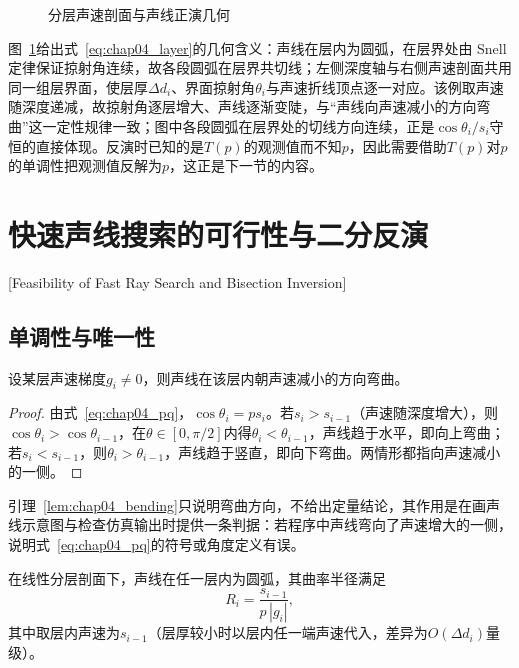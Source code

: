 \begin{figure}[htbp]
 \centering
 \begin{tikzpicture}[x=1cm,y=1cm]
  
 \end{tikzpicture}
 \caption[分层声速剖面与声线正演几何]{分层声速剖面与声线正演几何}
 \label{fig:chap04_ray_geom}
\end{figure}

图~\ref{fig:chap04_ray_geom}给出式~\eqref{eq:chap04_layer}的几何含义：声线在层内为圆弧，在层界处由 Snell 定律保证掠射角连续，故各段圆弧在层界共切线；左侧深度轴与右侧声速剖面共用同一组层界面，使层厚$\Delta d_i$、界面掠射角$\theta_i$与声速折线顶点逐一对应。该例取声速随深度递减，故掠射角逐层增大、声线逐渐变陡，与“声线向声速减小的方向弯曲”这一定性规律一致；图中各段圆弧在层界处的切线方向连续，正是$\cos\theta_i/s_i$守恒的直接体现。反演时已知的是$T(p)$的观测值而不知$p$，因此需要借助$T(p)$对$p$的单调性把观测值反解为$p$，这正是下一节的内容。

\section{快速声线搜索的可行性与二分反演}[Feasibility of Fast Ray Search and Bisection Inversion]
\label{sec:chap04_fast}

\subsection{单调性与唯一性}

\begin{lemma}[（弯曲方向）]
\label{lem:chap04_bending}
设某层声速梯度$g_i\ne0$，则声线在该层内朝声速减小的方向弯曲。
\end{lemma}

\begin{proof}
由式~\eqref{eq:chap04_pq}，$\cos\theta_i=p s_i$。若$s_i>s_{i-1}$（声速随深度增大），则$\cos\theta_i>\cos\theta_{i-1}$，在$\theta\in[0,\pi/2]$内得$\theta_i<\theta_{i-1}$，声线趋于水平，即向上弯曲；若$s_i<s_{i-1}$，则$\theta_i>\theta_{i-1}$，声线趋于竖直，即向下弯曲。两情形都指向声速减小的一侧。
\end{proof}

引理~\ref{lem:chap04_bending}只说明弯曲方向，不给出定量结论，其作用是在画声线示意图与检查仿真输出时提供一条判据：若程序中声线弯向了声速增大的一侧，说明式~\eqref{eq:chap04_pq}的符号或角度定义有误。

\begin{lemma}[（层内为圆弧）]
\label{lem:chap04_arc}
在线性分层剖面下，声线在任一层内为圆弧，其曲率半径满足
\begin{equation}
 R_i=\frac{s_{i-1}}{p\,|g_i|},
\label{eq:chap04_radius}
\end{equation}
其中取层内声速为$s_{i-1}$（层厚较小时以层内任一端声速代入，差异为$O(\Delta d_i)$量级）。
\end{lemma}

